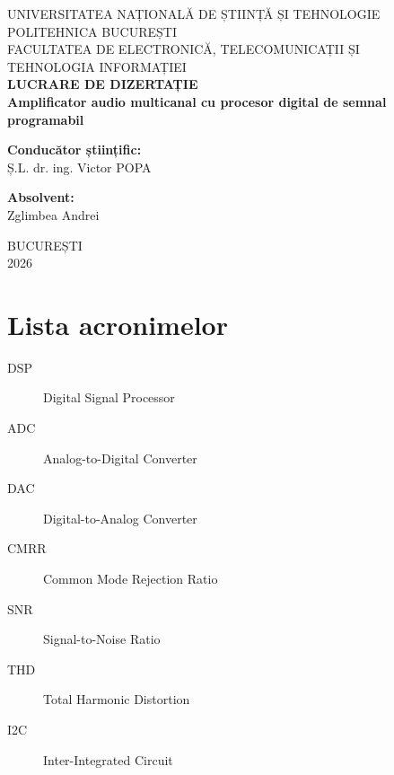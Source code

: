 \documentclass[12pt, a4paper, oneside]{report}
\begin{document}
\begin{titlepage}
    \centering
    \vspace*{1cm}
    {\large UNIVERSITATEA NAȚIONALĂ DE ȘTIINȚĂ ȘI TEHNOLOGIE \\ POLITEHNICA BUCUREȘTI}\\[0.5cm]
    {\large FACULTATEA DE ELECTRONICĂ, TELECOMUNICAȚII ȘI \\ TEHNOLOGIA INFORMAȚIEI}\\[2cm]
    
    {\Large \textbf{LUCRARE DE DIZERTAȚIE}}\\[1.5cm]
    
    {\huge \textbf{Amplificator audio multicanal cu procesor digital de semnal programabil}}\\[2cm]
    
    \vfill
    
    \begin{flushleft}
        \large \textbf{Conducător științific:}\\
        Ș.L. dr. ing. Victor POPA
    \end{flushleft}
    
    \begin{flushright}
        \large \textbf{Absolvent:}\\
        Zglimbea Andrei
    \end{flushright}
    
    \vfill
    
    {\large BUCUREȘTI\\ 2026}
\end{titlepage}

\tableofcontents
\listoffigures

\chapter*{Lista acronimelor}
\begin{description}
    \item[DSP] Digital Signal Processor
    \item[ADC] Analog-to-Digital Converter
    \item[DAC] Digital-to-Analog Converter
    \item[CMRR] Common Mode Rejection Ratio
    \item[SNR] Signal-to-Noise Ratio
    \item[THD] Total Harmonic Distortion
    \item[I2C] Inter-Integrated Circuit
\end{description}

\clearpage
{}









\end{document}
